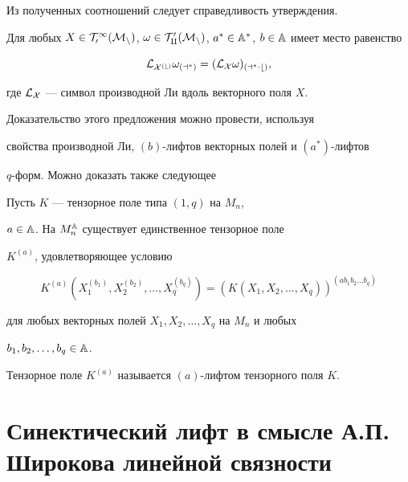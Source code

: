  


Из полученных соотношений следует справедливость утверждения.  


 


\begin{props} Для любых $X\in\cal T^1_0(M_n)$, $\omega\in\cal 


T^0_q(M_n)$, $a^*\in\Bbb A^*$, $b\in\Bbb A$ имеет место равенство 


$$ 


\cal L_{X^{(b)}}\omega_{(a^*)}=(\cal L_X\omega)_{(a^*\cdot b)}, 


$$ 


где $\cal L_X$ --- символ производной Ли вдоль векторного поля $X$. 


\end{props} 


 


Доказательство этого предложения можно провести, используя  


свойства производной Ли, $(b)$-лифтов векторных полей и $(a^*)$-лифтов  


$q$-форм. Можно доказать также следующее  


 


\begin{props} Пусть $K$ --- тензорное поле типа $(1,q)$ на $M_n$, 


$a\in\Bbb A$. На $M^{\Bbb A}_n$ существует единственное тензорное поле 


$K^{(a)}$, удовлетворяющее условию 


$$ 


K^{(a)}(X^{(b_1)}_1,X^{(b_2)}_2,\dotsc,X^{(b_q)}_q)= 


(K(X_1,X_2,\dotsc,X_q))^{(ab_1b_2\dotsc b_q)}


$$ 


для любых векторных полей $X_1,X_2,\dotsc,X_q$ на $M_n$ и любых 


$b_1,b_2,\dotsc,b_q\in\Bbb A$. 


\end{props} 


 


Тензорное поле $K^{(a)}$ называется $(a)$-лифтом тензорного поля $K$. 


 


\section{Синектический лифт в смысле А.П.\,Широкова линейной связности} 


